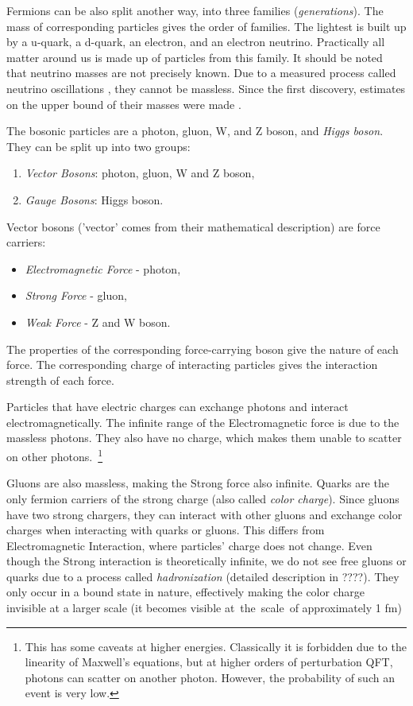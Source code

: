 Fermions can be also split another way, into three families (\emph{generations}). 
The mass of corresponding particles gives the order of families.
The lightest is built up by a u-quark, a d-quark, an electron, and an electron neutrino.
Practically all matter around us is made up of particles from this family.
It should be noted that neutrino masses are not precisely known.
Due to a measured process \cite{sadbury} called neutrino oscillations \cite{pdg}, they cannot be massless.
Since the first discovery, estimates on the upper bound of their masses were made \cite{pdg}.

The bosonic particles are a photon, gluon, W, and Z boson, and \emph{Higgs boson}. They can be split up into two groups:
\begin{enumerate}
    \item \emph{Vector Bosons}: photon, gluon, W and Z boson,
    \item \emph{Gauge Bosons}: Higgs boson.
\end{enumerate}
Vector bosons ('vector' comes from their mathematical description) are force carriers:
\begin{itemize}
    \item \emph{Electromagnetic Force} - photon,
    \item \emph{Strong Force} - gluon,
    \item \emph{Weak Force} - Z and W boson.
\end{itemize}
The properties of the corresponding force-carrying boson give the nature of each force.
The corresponding charge of interacting particles gives the interaction strength of each force.

Particles that have electric charges can exchange photons and interact electromagnetically.
The infinite range of the Electromagnetic force is due to the massless photons.
They also have no charge, which makes them unable to scatter on other photons.~\footnote{This has some caveats at higher energies. Classically it is forbidden due to the linearity of Maxwell's equations, but at higher orders of perturbation QFT, photons can scatter on another photon. However, the probability of such an event is very low.}

Gluons are also massless, making the Strong force also infinite.
Quarks are the only fermion carriers of the strong charge (also called \emph{color charge}). 
Since gluons have two strong chargers, they can interact with other gluons and exchange color charges when interacting with quarks or gluons.
This differs from Electromagnetic Interaction, where particles' charge does not change. 
Even though the Strong interaction is theoretically infinite, we do not see free gluons or quarks due to a process called \emph{hadronization} (detailed description in ????). 
They only occur in a bound state in nature, effectively making the color charge invisible at a larger scale (it becomes visible at~the~scale~of approximately 1 fm)

